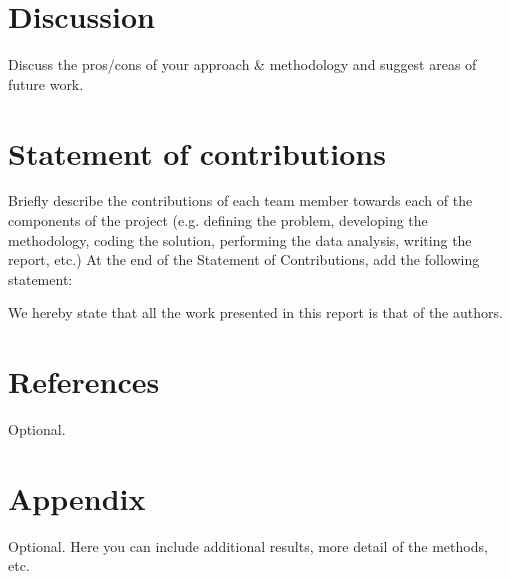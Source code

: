 \documentclass[conference]{IEEEtran}
\begin{document}
\section{Discussion}
Discuss the pros/cons of your approach \& methodology and suggest areas of future work.


\section*{Statement of contributions}

Briefly describe the contributions of each team member towards each of the components of the project (e.g. defining the problem, developing the methodology, coding the solution, performing the data analysis, writing the report, etc.) At the end of the Statement of Contributions, add the following statement: 

We hereby state that all the work presented in this report is that of the authors.


\section*{References}

Optional.



\section*{Appendix}

Optional. Here you can include additional results, more detail of the methods, etc.
\end{document}
